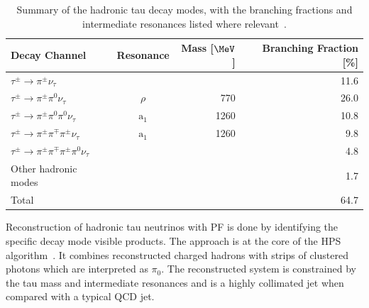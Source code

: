 \begin{table}[!htb]
\begin{tabular}{|l|c|r|r|}
\hline
Decay Channel & Resonance & Mass [$\MeV$] & Branching Fraction [\%] \\
\hline\hline
$\tau^{\pm} \rightarrow \pi^{\pm} \nu_\tau$                              &                &      & 11.6 \\
$\tau^{\pm} \rightarrow \pi^{\pm} \pi^{0}   \nu_\tau$                    & $\rho$         &  770 & 26.0 \\
$\tau^{\pm} \rightarrow \pi^{\pm} \pi^{0}   \pi^{0}   \nu_\tau$          & $\text{a}_{1}$ & 1260 & 10.8 \\
$\tau^{\pm} \rightarrow \pi^{\pm} \pi^{\mp} \pi^{\pm} \nu_\tau$          & $\text{a}_{1}$ & 1260 &  9.8 \\
$\tau^{\pm} \rightarrow \pi^{\pm} \pi^{\mp} \pi^{\pm} \pi^{0} \nu_\tau$  &                &      &  4.8 \\
\hline
Other hadronic modes                                                     &                &      &  1.7 \\
\hline\hline
Total & &  & 64.7 \\
\hline
\end{tabular}
\caption[Summary of the hadronic tau decay modes.]
{Summary of the hadronic tau decay modes, with the branching fractions and intermediate resonances listed where relevant~\cite{ARTICLE:PDG}.}
\label{TABLE:EventReconstructionAndSimulation_TauDecays}
\end{table}

Reconstruction of hadronic tau neutrinos with \gls{PF} is done by identifying the specific decay mode visible products. The approach is at the core of the \gls{HPS} algorithm~\cite{ARTICLE:CMSPerformaceOfTauLeptonReconstruction,ARTICLE:CMSReconstructionIndentificationTau}. It combines reconstructed charged hadrons with strips of clustered photons which are interpreted as $\pi_0$. The reconstructed system is constrained by the tau mass and intermediate resonances and is a highly collimated jet when compared with a typical \gls{QCD} jet.

